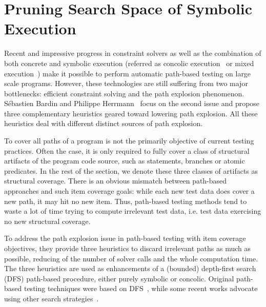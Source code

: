 \section{Pruning Search Space of Symbolic Execution}
Recent and impressive progress in constraint solvers as well as the combination of both concrete and symbolic execution (referred as concolic execution~\cite{cute,compositional} or mixed execution~\cite{mixed}) make it possible to perform automatic path-based testing on large scale programs. However, these technologies are still suffering from two major bottlenecks: efficient constraint solving and the path explosion phenomenon. S\'{e}bastien Bardin and Philippe Herrmann~\cite{prune} focus on the second issue and propose three complementary heuristics geared toward lowering path explosion. All these heuristics deal with different distinct sources of path explosion. 

To cover all paths of a program is not the primarily objective of current testing practices. Often the case, it is only required to fully cover a class of structural artifacts of the program code source, such as statements, branches or atomic predicates. In the rest of the section, we denote these three classes of artifacts as structural coverage. There is an obvious mismatch between path-based approaches and such item coverage goals: while each new test data does cover a new path, it may hit no new item. Thus, path-based testing methods tend to waste a lot of time trying to compute irrelevant test data, i.e. test data exercising no new structural coverage. 


To address the path explosion issue in path-based testing with item coverage objectives, they provide three heuristics to discard irrelevant paths as much as possible, reducing of the number of solver calls and the whole computation time. The three heuristics are used as enhancements of a (bounded) depth-first search (DFS) path-based procedure, either purely symbolic or concolic. Original path-based testing techniques were based on DFS~\cite{dart,cute, onthefly}, while some recent works advocate using other search strategies~\cite{exe,hybrid,fuzz}.

